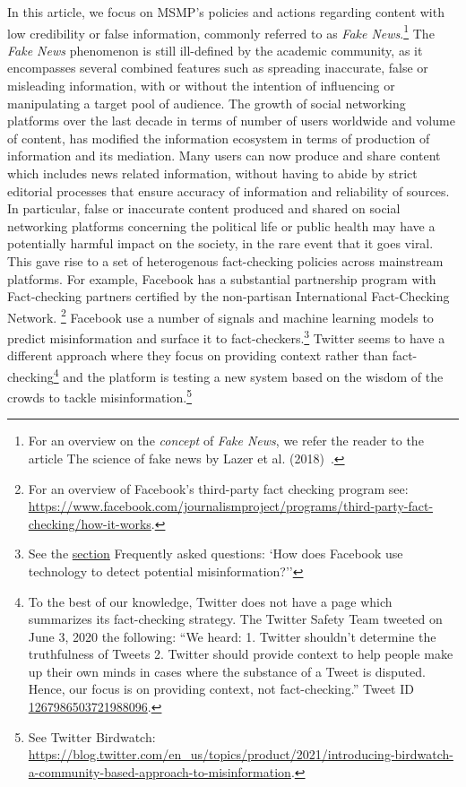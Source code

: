 \documentclass{article}
\begin{document}
\smallskip

In this article, we focus on MSMP's policies and actions regarding content with low credibility or false information, commonly referred to as {\it Fake News}.\footnote{For an overview on the {\it concept} of {\it Fake News}, we refer the reader to the article The science of fake news by Lazer et al. (2018)~\cite{lazer}.} The {\it Fake News} phenomenon is still ill-defined by the academic community, as it encompasses several combined features such as spreading inaccurate, false or misleading information, with or without the intention of influencing or manipulating a target pool of audience. The growth of social networking platforms over the last decade in terms of number of users worldwide and volume of content, has modified the information ecosystem in terms of production of information and its mediation. Many users can now produce and share content which includes news related information, without having to abide by strict editorial processes that ensure accuracy of information and reliability of sources. In particular, false or inaccurate content produced and shared on social networking platforms concerning the political life or public health may have a potentially harmful impact on the society, in the rare event that it goes viral. This gave rise to a set of heterogenous fact-checking policies across mainstream platforms. For example, Facebook has a substantial partnership program with Fact-checking partners certified by the non-partisan International Fact-Checking Network. \footnote{For an overview of Facebook's third-party fact checking program see: \href{https://www.facebook.com/journalismproject/programs/third-party-fact-checking/how-it-works}{https://www.facebook.com/journalismproject/programs/third-party-fact-checking/how-it-works}.} Facebook use a number of signals and machine learning models to predict misinformation and surface it to fact-checkers.\footnote{See the \href{https://www.facebook.com/journalismproject/programs/third-party-fact-checking/how-it-works}{section} Frequently asked questions: `How does Facebook use technology to detect potential misinformation?''} Twitter seems to have a different approach where they focus on providing context rather than fact-checking\footnote{To the best of our knowledge, Twitter does not have a page which summarizes its fact-checking strategy. The Twitter Safety Team tweeted on June 3, 2020 the following:  ``We heard: 1. Twitter shouldn’t determine the truthfulness of Tweets 2. Twitter should provide context to help people make up their own minds in cases where the substance of a Tweet is disputed. Hence, our focus is on providing context, not fact-checking.'' Tweet ID \href{https://twitter.com/TwitterSafety/status/1267986503721988096}{1267986503721988096}.} and the platform is testing a new system based on the wisdom of the crowds to tackle misinformation.\footnote{See Twitter Birdwatch: \href{https://blog.twitter.com/en\_us/topics/product/2021/introducing-birdwatch-a-community-based-approach-to-misinformation}{https://blog.twitter.com/en\_us/topics/product/2021/introducing-birdwatch-a-community-based-approach-to-misinformation}.}
\end{document}

